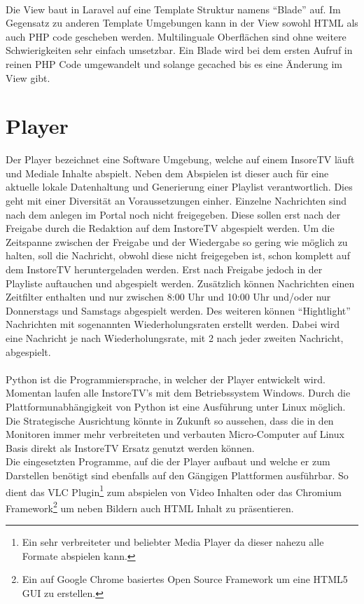 \\Die View baut in Laravel auf eine Template Struktur namens "`Blade"' auf. Im Gegensatz zu anderen Template Umgebungen kann in der View sowohl HTML als auch PHP code gescheben werden. Multilinguale Oberflächen sind ohne weitere Schwierigkeiten sehr einfach umsetzbar. Ein Blade wird bei dem ersten Aufruf in reinen PHP Code umgewandelt und solange gecached bis es eine Änderung im View gibt.


\section{Player}
\label{sec:Player}
Der Player bezeichnet eine Software Umgebung, welche auf einem InsoreTV läuft und Mediale Inhalte abspielt. Neben dem Abspielen ist dieser auch für eine aktuelle lokale Datenhaltung und Generierung einer Playlist verantwortlich. Dies geht mit einer Diversität an Voraussetzungen einher. Einzelne Nachrichten sind nach dem anlegen im Portal noch nicht freigegeben. Diese sollen erst nach der Freigabe durch die Redaktion auf dem InstoreTV abgespielt werden. Um die Zeitspanne zwischen der Freigabe und der Wiedergabe so gering wie möglich zu halten, soll die Nachricht, obwohl diese nicht freigegeben ist, schon komplett auf dem InstoreTV heruntergeladen werden. Erst nach Freigabe jedoch in der Playliste auftauchen und abgespielt werden. Zusätzlich können Nachrichten einen Zeitfilter enthalten und nur \zB zwischen 8:00 Uhr und 10:00 Uhr und/oder nur Donnerstags und Samstags abgespielt werden. Des weiteren können "`Hightlight"' Nachrichten mit sogenannten  Wiederholungsraten erstellt werden. Dabei wird eine Nachricht  je nach Wiederholungsrate, \zB mit 2 nach jeder zweiten Nachricht, abgespielt.
\\\\Python ist die Programmiersprache, in welcher der Player entwickelt wird. Momentan laufen alle InstoreTV's mit dem Betriebssystem Windows. Durch die Plattformunabhängigkeit von Python ist eine Ausführung unter Linux möglich. Die Strategische Ausrichtung könnte in Zukunft so aussehen, dass die in den Monitoren immer mehr verbreiteten und verbauten Micro-Computer auf Linux Basis direkt als InstoreTV Ersatz genutzt werden können.
\\Die eingesetzten Programme, auf die der Player aufbaut und welche er zum Darstellen benötigt sind ebenfalls auf den Gängigen Plattformen ausführbar. So dient das VLC Plugin\footnote{Ein sehr verbreiteter und beliebter Media Player da dieser nahezu alle Formate abspielen kann.} zum abspielen von Video Inhalten oder das Chromium  Framework\footnote{Ein auf Google Chrome basiertes Open Source Framework um eine HTML5 GUI zu erstellen.} um neben Bildern auch HTML Inhalt zu präsentieren.


